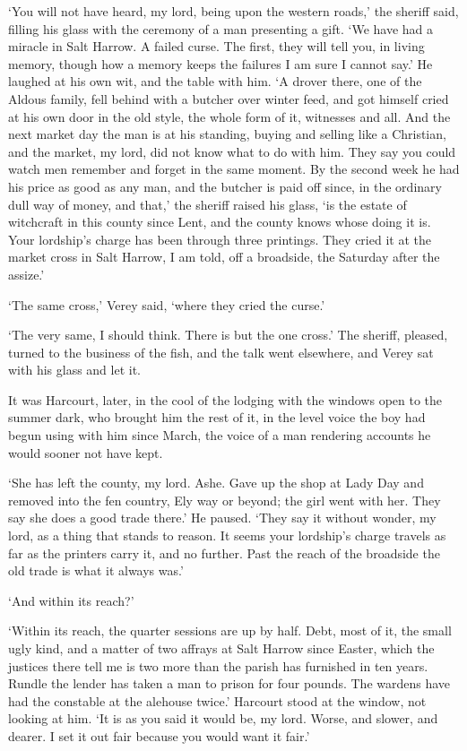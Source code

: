 \documentclass[11pt]{article}
\begin{document}
`You will not have heard, my lord, being upon the western roads,' the sheriff said, filling his glass with the ceremony of a man presenting a gift. `We have had a miracle in Salt Harrow. A failed curse. The first, they will tell you, in living memory, though how a memory keeps the failures I am sure I cannot say.' He laughed at his own wit, and the table with him. `A drover there, one of the Aldous family, fell behind with a butcher over winter feed, and got himself cried at his own door in the old style, the whole form of it, witnesses and all. And the next market day the man is at his standing, buying and selling like a Christian, and the market, my lord, did not know what to do with him. They say you could watch men remember and forget in the same moment. By the second week he had his price as good as any man, and the butcher is paid off since, in the ordinary dull way of money, and that,' the sheriff raised his glass, `is the estate of witchcraft in this county since Lent, and the county knows whose doing it is. Your lordship's charge has been through three printings. They cried it at the market cross in Salt Harrow, I am told, off a broadside, the Saturday after the assize.'

`The same cross,' Verey said, `where they cried the curse.'

`The very same, I should think. There is but the one cross.' The sheriff, pleased, turned to the business of the fish, and the talk went elsewhere, and Verey sat with his glass and let it.

It was Harcourt, later, in the cool of the lodging with the windows open to the summer dark, who brought him the rest of it, in the level voice the boy had begun using with him since March, the voice of a man rendering accounts he would sooner not have kept.

`She has left the county, my lord. Ashe. Gave up the shop at Lady Day and removed into the fen country, Ely way or beyond; the girl went with her. They say she does a good trade there.' He paused. `They say it without wonder, my lord, as a thing that stands to reason. It seems your lordship's charge travels as far as the printers carry it, and no further. Past the reach of the broadside the old trade is what it always was.'

`And within its reach?'

`Within its reach, the quarter sessions are up by half. Debt, most of it, the small ugly kind, and a matter of two affrays at Salt Harrow since Easter, which the justices there tell me is two more than the parish has furnished in ten years. Rundle the lender has taken a man to prison for four pounds. The wardens have had the constable at the alehouse twice.' Harcourt stood at the window, not looking at him. `It is as you said it would be, my lord. Worse, and slower, and dearer. I set it out fair because you would want it fair.'
\end{document}
